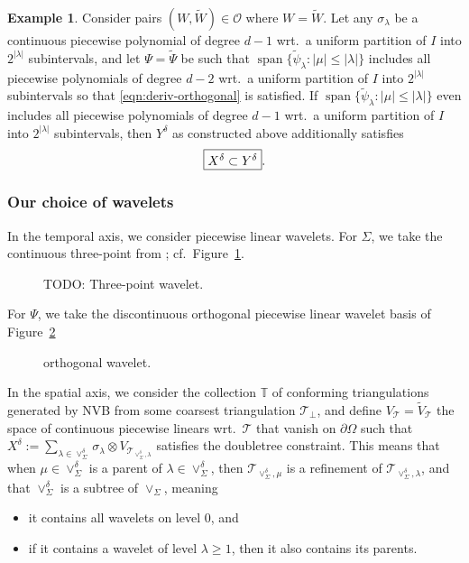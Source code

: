 \documentclass[11pt,a4paper,oneside,english]{amsart}
\numberwithin{equation}{section}
\numberwithin{theorem}{section}
\theoremstyle{definition}
\newtheorem{example}[theorem]{Example}
\DeclareMathOperator{\spann}{span}
\newcommand{\T}{\mathcal{T}}
\newcommand{\jw}[1]{{\color{red}{JW: #1}}}
\begin{document}
\begin{example}
  Consider pairs $(W, \tilde W) \in \mathcal O$ where $W = \tilde W$.
  Let any $\sigma_\lambda$ be a continuous piecewise polynomial of degree $d-1$\jw{voor $d$ de dimensie van je space domain?! of gewoon *een* $d$? in het tweede geval: rename naar $p$?}
  wrt.~a uniform partition of $I$ into $2^{|\lambda|}$ subintervals, and let 
  $\Psi=\tilde{\Psi}$ be such that $\spann\{\tilde{\psi}_\lambda : |\mu| \leq |\lambda|\}$
  includes all piecewise polynomials of degree $d-2$ wrt.~a uniform partition
  of $I$ into $2^{|\lambda|}$ subintervals so that \eqref{eqn:deriv-orthogonal}
  is satisfied. If $\spann\{\tilde{\psi}_\lambda : |\mu| \leq |\lambda|\}$ even
  includes all piecewise polynomials of degree $d-1$ wrt.~a uniform partition
  of $I$ into $2^{|\lambda|}$ subintervals, then $Y^\delta$ as constructed above
  additionally satisfies
  \begin{equation}
    \label{eqn:inclusion}
      \framebox{$X^\delta \subset Y^\delta$}.
  \end{equation}
\end{example}

\subsubsection{Our choice of wavelets}
\label{sec:wavelets}
In the temporal axis, we consider piecewise linear wavelets. For $\Sigma$, we take the continuous three-point from \cite{Stevenson1998}; cf.~Figure~\ref{fig:3pt-wavelet}.
\begin{figure}
  \caption{TODO: Three-point wavelet.}
  \label{fig:3pt-wavelet}
\end{figure}

For $\Psi$, we take the discontinuous orthogonal piecewise linear wavelet basis
of Figure~\ref{fig:ortho-wavelet}\jw{again, needs citation; ik kon niks vinden zo 1-2-3;
misschien omdat het niet echt een ``wavelet'' in de typische zin is?}
\begin{figure}
  \caption{orthogonal wavelet.}
  \label{fig:ortho-wavelet}
\end{figure}

In the spatial axis, we consider the collection $\mathbb T$ of conforming
triangulations generated by NVB from some coarsest triangulation $\T_\perp$,
and define $V_\T = \tilde V_\T$ the space of continuous piecewise linears wrt.~$\T$
that vanish on $\partial \Omega$ such that $X^\delta := \sum_{\lambda \in \vee^\delta_\Sigma} \sigma_\lambda \otimes V_{\T_{\vee^\delta_\Sigma, \lambda}}$ satisfies the doubletree constraint.
This means that when $\mu \in \vee^\delta_\Sigma$ is a parent of $\lambda \in \vee^\delta_\Sigma$,
    then $\T_{\vee^\delta_\Sigma, \mu}$ is a refinement of $\T_{\vee^\delta_\Sigma, \lambda}$, and that $\vee^\delta_\Sigma$ is a subtree of $\vee_\Sigma$, meaning
\begin{itemize}
  \item it contains all wavelets on level 0, and
  \item if it contains a wavelet of level $\lambda \geq 1$, then it also contains
    its parents.
\end{itemize}
\end{document}
